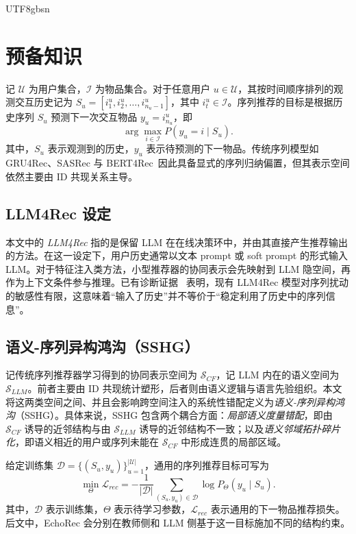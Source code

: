 \documentclass{article}
\begin{document}
\begin{CJK*}{UTF8}{gbsn}
\section{预备知识}
\label{sec:preliminary}

记 $\mathcal{U}$ 为用户集合，$\mathcal{I}$ 为物品集合。对于任意用户 $u\in\mathcal{U}$，其按时间顺序排列的观测交互历史记为 $S_u=[i_1^u,i_2^u,\dots,i_{n_u-1}^u]$，其中 $i_t^u\in\mathcal{I}$。序列推荐的目标是根据历史序列 $S_u$ 预测下一次交互物品 $y_u=i_{n_u}^u$，即
\begin{equation}
\arg\max_{i \in \mathcal{I}} P(y_u=i \mid S_u).
\end{equation}
其中，$S_u$ 表示观测到的历史，$y_u$ 表示待预测的下一物品。传统序列模型如 GRU4Rec、SASRec 与 BERT4Rec~\cite{hidasi2016gru4rec,kang2018sasrec,sun2019bert4rec}因此具备显式的序列归纳偏置，但其表示空间依然主要由 ID 共现关系主导。

\subsection{LLM4Rec 设定}

本文中的 \emph{LLM4Rec} 指的是保留 LLM 在在线决策环中，并由其直接产生推荐输出的方法。在这一设定下，用户历史通常以文本 prompt 或 soft prompt 的形式输入 LLM。对于特征注入类方法，小型推荐器的协同表示会先映射到 LLM 隐空间，再作为上下文条件参与推理。已有诊断证据~\cite{kim2025lost} 表明，现有 LLM4Rec 模型对序列扰动的敏感性有限，这意味着“输入了历史”并不等价于“稳定利用了历史中的序列信息”。

\subsection{语义-序列异构鸿沟（SSHG）}

记传统序列推荐器学习得到的协同表示空间为 $\mathcal{S}_{CF}$，记 LLM 内在的语义空间为 $\mathcal{S}_{LLM}$。前者主要由 ID 共现统计塑形，后者则由语义逻辑与语言先验组织。本文将这两类空间之间、并且会影响跨空间注入的系统性错配定义为\emph{语义-序列异构鸿沟}（SSHG）。具体来说，SSHG 包含两个耦合方面：\emph{局部语义度量错配}，即由 $\mathcal{S}_{CF}$ 诱导的近邻结构与由 $\mathcal{S}_{LLM}$ 诱导的近邻结构不一致；以及\emph{语义邻域拓扑碎片化}，即语义相近的用户或序列未能在 $\mathcal{S}_{CF}$ 中形成连贯的局部区域。

给定训练集 $\mathcal{D}=\{(S_u,y_u)\}_{u=1}^{|\mathcal{U}|}$，通用的序列推荐目标可写为
\begin{equation}
\min_{\Theta}\mathcal{L}_{rec}
=
-\frac{1}{|\mathcal{D}|}\sum_{(S_u,y_u)\in\mathcal{D}}
\log P_{\Theta}(y_u\mid S_u).
\end{equation}
其中，$\mathcal{D}$ 表示训练集，$\Theta$ 表示待学习参数，$\mathcal{L}_{rec}$ 表示通用的下一物品推荐损失。后文中，EchoRec 会分别在教师侧和 LLM 侧基于这一目标施加不同的结构约束。


\end{CJK*}
\end{document}
